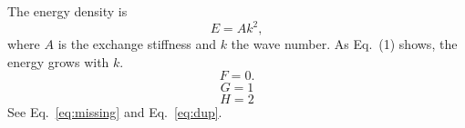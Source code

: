 \documentclass{article}
\begin{document}
The energy density is
\begin{equation}
E = A k^2 ,
\label{eq:energy}
\end{equation}
where $A$ is the exchange stiffness and $k$ the wave number.
As Eq.~(1) shows, the energy grows with $k$.   %
\begin{equation}
F = 0 .
\end{equation}                                %
\begin{align}
G = 1 \label{eq:dup}
\end{align}
\begin{equation}
H = 2 \label{eq:dup}
\end{equation}                                %
See Eq.~\eqref{eq:missing} and Eq.~\eqref{eq:dup}.   %
\end{document}

